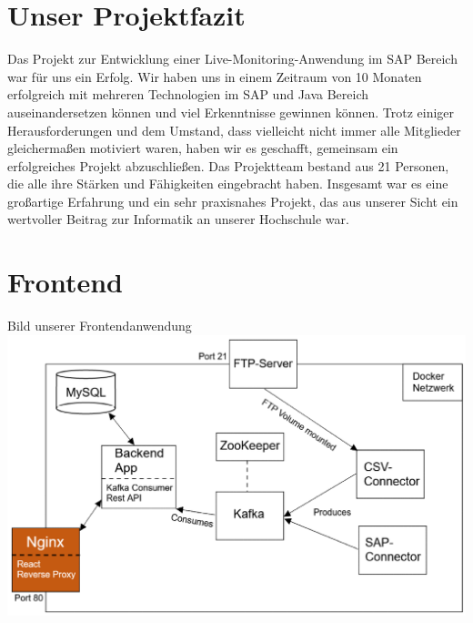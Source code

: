 \section*{Unser Projektfazit}
Das Projekt zur Entwicklung einer Live-Monitoring-Anwendung im SAP Bereich war für uns ein Erfolg. Wir haben uns in einem Zeitraum von 10 Monaten erfolgreich mit mehreren Technologien im SAP und Java Bereich auseinandersetzen können und viel Erkenntnisse gewinnen können.
\newline
Trotz einiger Herausforderungen und dem Umstand, dass vielleicht nicht immer alle Mitglieder gleichermaßen motiviert waren, haben wir es geschafft, gemeinsam ein erfolgreiches Projekt abzuschließen.
\newline
\newline
Das Projektteam bestand aus 21 Personen, die alle ihre Stärken und Fähigkeiten eingebracht haben. Insgesamt war es eine großartige Erfahrung und ein sehr praxisnahes Projekt, das aus unserer Sicht ein wertvoller Beitrag zur Informatik an unserer Hochschule war.

\section*{Frontend}
Bild unserer Frontendanwendung
\includegraphics[width=\linewidth]{src/abbildungen/Architektur.png}
\newline
{}
\newline

